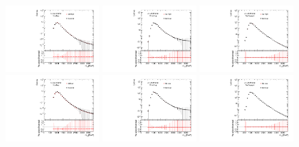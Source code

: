 \begin{figure}[htbp!]
\begin{center}
\includegraphics[width=0.31\textwidth,angle=-90]{figures/boosted/Syst_CRSB/SB_High_compare_FourTag_qcd_hh.pdf}
\includegraphics[width=0.31\textwidth,angle=-90]{figures/boosted/Syst_CRSB/SB_High_compare_ThreeTag_qcd_hh.pdf}
\includegraphics[width=0.31\textwidth,angle=-90]{figures/boosted/Syst_CRSB/SB_High_compare_TwoTag_split_qcd_hh.pdf}
\includegraphics[width=0.31\textwidth,angle=-90]{figures/boosted/Syst_CRSB/SB_Low_compare_FourTag_qcd_hh.pdf}
\includegraphics[width=0.31\textwidth,angle=-90]{figures/boosted/Syst_CRSB/SB_Low_compare_ThreeTag_qcd_hh.pdf}
\includegraphics[width=0.31\textwidth,angle=-90]{figures/boosted/Syst_CRSB/SB_Low_compare_TwoTag_split_qcd_hh.pdf}

\end{center}
\end{figure}
